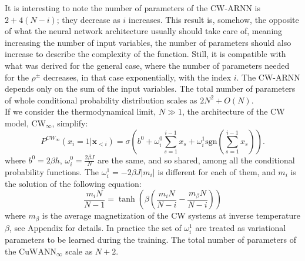 \documentclass[aps,physrev,10pt,floatfix,reprint]{revtex4-2}
\begin{document}
It is interesting to note the number of parameters of the CW-ARNN is $2+4(N-i)$; they decrease as $i$ increases. This result is, somehow, the opposite of what the neural network architecture usually should take care of, meaning increasing the number of input variables, the number of parameters should also increase to describe the complexity of the function. Still, it is compatible with what was derived for the general case, where the number of parameters needed for the $\rho^{\pm}$ decreases, in that case exponentially, with the index $i$. The CW-ARNN depends only on the sum of the input variables.
The total number of parameters of whole conditional probability distribution scales as $2N^2+ O(N)$. \\
If we consider the thermodynamical limit, $N \gg 1$, the architecture of the CW model, $\text{CW}_{\infty}$, simplify:
\begin{equation*}
    P^{CW_{\infty}}\left(x_{i}=1|\mathbf{x}_{<i}\right) =  \sigma \left(b^0+\omega_{i}^0\sum_{s=1}^{i-1}x_{s} + \omega_i^1 \text{sgn}(\sum_{s=1}^{i-1}x_{s})\right).
\end{equation*}
where $b^0=2\beta h$, $\omega^0_i = \frac{2\beta J}{N}$ are the same, and so shared, among all the conditional probability functions. The $\omega^1_i = -2\beta J |m_i|$ is different for each of them, and $m_i$ is the solution of the following equation:
\begin{equation}
    \frac{m_i N}{N-1} = \tanh \left( \beta(\frac{m_i N}{N - i} - \frac{m_{\beta}N}{N-i}) \right)
    \label{eq:extrem_i}
    \end{equation}
where $m_{\beta}$ is the average magnetization of the CW systems at inverse temperature $\beta$, see Appendix for details. In practice the set of $\omega^1_i$ are treated as variational parameters to be learned during the training. The total number of parameters of the $\text{CuWANN}_{\infty}$ scale as $N+2$.
    
\end{document}
